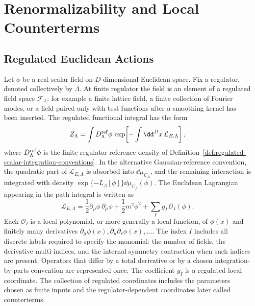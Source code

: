 \chapter{Renormalizability and Local Counterterms}
\label{ch:volume-ii-renormalizability-local-counterterms}
\ConventionsEuclidean


\section{Regulated Euclidean Actions}

Let \(\phi\) be a real scalar field on \(D\)-dimensional Euclidean space.
Fix a regulator, denoted collectively by \(\Lambda\).  At finite regulator the
field is an element of a regulated field space \(\mathcal F_{\Lambda}\): for
example a finite lattice field, a finite collection of Fourier modes, or a
field paired only with test functions after a smoothing kernel has been
inserted.  The regulated functional integral has the form
\[
  Z_{\Lambda}
  =
  \int D_\Lambda^{\rm ref}\phi\,
  \exp\!\left[
    -\int \dd^Dx\,\mathcal L_{E,\Lambda}
  \right],
\]
where \(D_\Lambda^{\rm ref}\phi\) is the finite-regulator reference density of
Definition~\ref{def:regulated-scalar-integration-conventions}.  In the
alternative Gaussian-reference convention, the quadratic part of
\(\mathcal L_{E,\Lambda}\) is absorbed into \(\dd\mu_{C_\Lambda}\), and the
remaining interaction is integrated with density
\(\exp\{-L_\Lambda[\phi]\}\dd\mu_{C_\Lambda}(\phi)\).  The Euclidean
Lagrangian appearing in the path integral is written as
\[
  \mathcal L_{E,\Lambda}
  =
  \frac12 \partial_{\mu}\phi\,\partial_{\mu}\phi
  +
  \frac12 m^2\phi^2
  +
  \sum_I g_I\,\mathcal O_I(\phi).
\]
Each \(\mathcal O_I\) is a local polynomial, or more generally a local
function, of \(\phi(x)\) and finitely many derivatives
\(\partial_{\mu}\phi(x),\partial_{\mu}\partial_{\nu}\phi(x),\ldots\).
The index \(I\) includes all discrete labels required to specify the monomial:
the number of fields, the derivative multi-indices, and the internal symmetry
contraction when such indices are present.  Operators that differ by a total
derivative or by a chosen integration-by-parts convention are represented once.
The coefficient \(g_I\) is a regulated local coordinate.  The collection of
regulated coordinates includes the parameters chosen as finite inputs and the
regulator-dependent coordinates later called counterterms.

